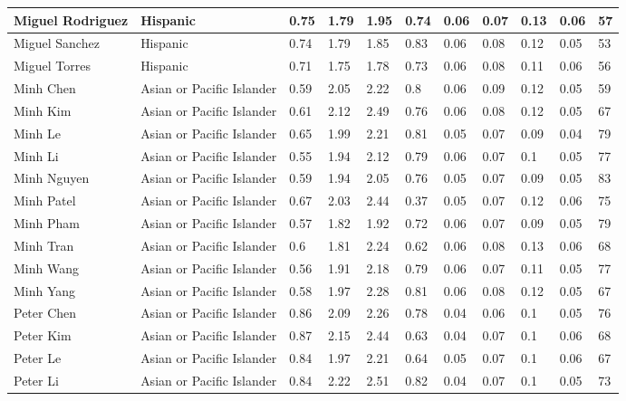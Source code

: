 \begin{table}[!ht]
\begin{tabular}{|l|l|l|l|l|l|l|l|l|l|l|}
        Miguel Rodriguez & Hispanic & 0.75 & 1.79 & 1.95 & 0.74 & 0.06 & 0.07 & 0.13 & 0.06 & 57 \\ \hline
        Miguel Sanchez & Hispanic & 0.74 & 1.79 & 1.85 & 0.83 & 0.06 & 0.08 & 0.12 & 0.05 & 53 \\ \hline
        Miguel Torres & Hispanic & 0.71 & 1.75 & 1.78 & 0.73 & 0.06 & 0.08 & 0.11 & 0.06 & 56 \\ \hline
        Minh Chen & Asian or Pacific Islander & 0.59 & 2.05 & 2.22 & 0.8 & 0.06 & 0.09 & 0.12 & 0.05 & 59 \\ \hline
        Minh Kim & Asian or Pacific Islander & 0.61 & 2.12 & 2.49 & 0.76 & 0.06 & 0.08 & 0.12 & 0.05 & 67 \\ \hline
        Minh Le & Asian or Pacific Islander & 0.65 & 1.99 & 2.21 & 0.81 & 0.05 & 0.07 & 0.09 & 0.04 & 79 \\ \hline
        Minh Li & Asian or Pacific Islander & 0.55 & 1.94 & 2.12 & 0.79 & 0.06 & 0.07 & 0.1 & 0.05 & 77 \\ \hline
        Minh Nguyen & Asian or Pacific Islander & 0.59 & 1.94 & 2.05 & 0.76 & 0.05 & 0.07 & 0.09 & 0.05 & 83 \\ \hline
        Minh Patel & Asian or Pacific Islander & 0.67 & 2.03 & 2.44 & 0.37 & 0.05 & 0.07 & 0.12 & 0.06 & 75 \\ \hline
        Minh Pham & Asian or Pacific Islander & 0.57 & 1.82 & 1.92 & 0.72 & 0.06 & 0.07 & 0.09 & 0.05 & 79 \\ \hline
        Minh Tran & Asian or Pacific Islander & 0.6 & 1.81 & 2.24 & 0.62 & 0.06 & 0.08 & 0.13 & 0.06 & 68 \\ \hline
        Minh Wang & Asian or Pacific Islander & 0.56 & 1.91 & 2.18 & 0.79 & 0.06 & 0.07 & 0.11 & 0.05 & 77 \\ \hline
        Minh Yang & Asian or Pacific Islander & 0.58 & 1.97 & 2.28 & 0.81 & 0.06 & 0.08 & 0.12 & 0.05 & 67 \\ \hline
        Peter Chen & Asian or Pacific Islander & 0.86 & 2.09 & 2.26 & 0.78 & 0.04 & 0.06 & 0.1 & 0.05 & 76 \\ \hline
        Peter Kim & Asian or Pacific Islander & 0.87 & 2.15 & 2.44 & 0.63 & 0.04 & 0.07 & 0.1 & 0.06 & 68 \\ \hline
        Peter Le & Asian or Pacific Islander & 0.84 & 1.97 & 2.21 & 0.64 & 0.05 & 0.07 & 0.1 & 0.06 & 67 \\ \hline
        Peter Li & Asian or Pacific Islander & 0.84 & 2.22 & 2.51 & 0.82 & 0.04 & 0.07 & 0.1 & 0.05 & 73 \\ \hline

\end{tabular}
\end{table}
